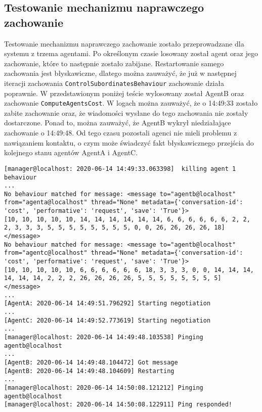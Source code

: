 \subsection{Testowanie mechanizmu naprawczego zachowanie}
Testowanie mechanizmu naprawczego zachowanie zostało przeprowadzane dla systemu z trzema agentami. Po określonym czasie losowany został agent oraz jego zachowanie, które to następnie zostało zabijane. Restartowanie samego zachowania jest błyskawiczne, dlatego można zauważyć, że już w następnej iteracji zachowania \texttt{ControlSubordinatesBehaviour} zachowanie działa poprawnie. W przedstawionym poniżej teście wylosowany został AgentB oraz zachowanie \texttt{ComputeAgentsCost}. W logach można zauważyć, że o 14:49:33 zostało zabite zachowanie oraz, że wiadomości wysłane do tego zachowania nie zostały dostarczone. Ponad to, można zauważyć, że AgentB wykrył niedziałające zachowanie o 14:49:48. Od tego czasu pozostali agenci nie mieli problemu z nawiązaniem kontaktu, o czym może świadczyć fakt błyskawicznego przejścia do kolejnego stanu agentów AgentA i AgentC.
\begin{lstlisting}
[manager@localhost: 2020-06-14 14:49:33.063398]  killing agent 1 behaviour 
...
No behaviour matched for message: <message to="agentb@localhost" from="agenta@localhost" thread="None" metadata={'conversation-id': 'cost', 'performative': 'request', 'save': 'True'}>
[10, 10, 10, 10, 10, 14, 14, 14, 14, 14, 14, 6, 6, 6, 6, 6, 6, 2, 2, 2, 3, 3, 3, 5, 5, 5, 5, 5, 5, 5, 5, 0, 0, 26, 26, 26, 26, 18]
</message>
No behaviour matched for message: <message to="agentb@localhost" from="agentc@localhost" thread="None" metadata={'conversation-id': 'cost', 'performative': 'request', 'save': 'True'}>
[10, 10, 10, 10, 10, 6, 6, 6, 6, 6, 6, 18, 3, 3, 3, 0, 0, 14, 14, 14, 14, 14, 14, 2, 2, 2, 26, 26, 26, 26, 5, 5, 5, 5, 5, 5, 5, 5]
</message>
...
[AgentA: 2020-06-14 14:49:51.796292] Starting negotiation
...
[AgentC: 2020-06-14 14:49:52.773619] Starting negotiation
...
[manager@localhost: 2020-06-14 14:49:48.103538] Pinging agentb@localhost
...
[AgentB: 2020-06-14 14:49:48.104472] Got message
[AgentB: 2020-06-14 14:49:48.104609] Restarting
...
[manager@localhost: 2020-06-14 14:50:08.121212] Pinging agentb@localhost
[manager@localhost: 2020-06-14 14:50:08.122911] Ping responded!
\end{lstlisting}
